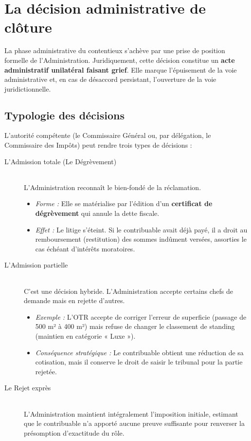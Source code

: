 \documentclass[Cours_contentieuxTF2026.tex]{subfiles}
\begin{document}
\section{La décision administrative de clôture}

La phase administrative du contentieux s'achève par une prise de position formelle de l'Administration. Juridiquement, cette décision constitue un \textbf{acte administratif unilatéral faisant grief}. Elle marque l'épuisement de la voie administrative et, en cas de désaccord persistant, l'ouverture de la voie juridictionnelle.

\subsection{Typologie des décisions}

L'autorité compétente (le Commissaire Général ou, par délégation, le Commissaire des Impôts) peut rendre trois types de décisions :

\begin{description}
	\item[L'Admission totale (Le Dégrèvement)] \hfill \\
	L'Administration reconnaît le bien-fondé de la réclamation.
	\begin{itemize}
		\item \textit{Forme :} Elle se matérialise par l'édition d'un \textbf{certificat de dégrèvement} qui annule la dette fiscale.
		\item \textit{Effet :} Le litige s'éteint. Si le contribuable avait déjà payé, il a droit au remboursement (restitution) des sommes indûment versées, assorties le cas échéant d'intérêts moratoires.
	\end{itemize}
	
	\item[L'Admission partielle] \hfill \\
	C'est une décision hybride. L'Administration accepte certains chefs de demande mais en rejette d'autres.
	\begin{itemize}
		\item \textit{Exemple :} L'OTR accepte de corriger l'erreur de superficie (passage de 500 m² à 400 m²) mais refuse de changer le classement de standing (maintien en catégorie « Luxe »).
		\item \textit{Conséquence stratégique :} Le contribuable obtient une réduction de sa cotisation, mais il conserve le droit de saisir le tribunal pour la partie rejetée.
	\end{itemize}
	
	\item[Le Rejet exprès] \hfill \\
	L'Administration maintient intégralement l'imposition initiale, estimant que le contribuable n'a apporté aucune preuve suffisante pour renverser la présomption d'exactitude du rôle.
\end{description}
\end{document}
